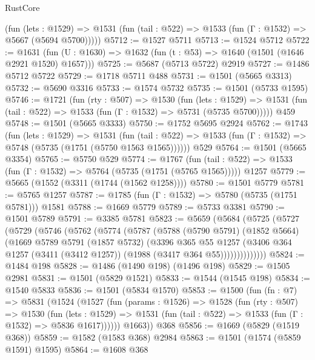 \begin{lexlean}{RustCore}
\begin{coremodule}
      (fun (lets : @1529) =>
      @1531 (fun (tail : @522) => @1533 (fun (Γ : @1532) => @5667 (@5694 @5700)))))
@5712 := @1527 @5711
@5713 := @1524 @5712
@5722 := @1631 (fun (U : @1630) => @1632 (fun (t : @53) => @1640 (@1501 (@1646 @2921 @1520) @1657)))
@5725 := @5687 (@5713 @5722) @2919
@5727 := @1486 @5712 @5722
@5729 := @1718 @5711 @488
@5731 := @1501 (@5665 @3313)
@5732 := @5690 @3316
@5733 := @1574 @5732
@5735 := @1501 (@5733 @1595)
@5746 := @1721
    (fun (rty : @507) =>
    @1530
      (fun (lets : @1529) =>
      @1531 (fun (tail : @522) => @1533 (fun (Γ : @1532) => @5731 (@5735 @5700)))))
    @459
@5748 := @1501 (@5665 @3333)
@5750 := @1752 @5695 @2924
@5762 := @1743
    (fun (lets : @1529) =>
    @1531
      (fun (tail : @522) => @1533 (fun (Γ : @1532) => @5748 (@5735 (@1751 (@5750 @1563 @1565))))))
    @529
@5764 := @1501 (@5665 @3354)
@5765 := @5750 @529
@5774 := @1767
    (fun (tail : @522) => @1533 (fun (Γ : @1532) => @5764 (@5735 (@1751 (@5765 @1565)))))
    @1257
@5779 := @5665 (@1552 (@3311 (@1744 (@1562 @1258))))
@5780 := @1501 @5779
@5781 := @5765 @1257
@5787 := @1785 (fun (Γ : @1532) => @5780 (@5735 (@1751 @5781))) @1581
@5788 := @1669 @5779
@5789 := @5733 @3381
@5790 := @1501 @5789
@5791 := @3385 @5781
@5823 := @5659
    (@5684
      (@5725
        (@5727
          (@5729
            (@5746
              (@5762
                (@5774
                  (@5787
                    (@5788
                      (@5790 @5791)
                      (@1852 @5664)
                      (@1669
                        @5789
                        @5791
                        (@1857 @5732)
                        (@3396
                          @365
                          @55
                          @1257
                          (@3406
                            @364
                            @1257
                            (@3411 (@3412 @1257))
                            (@1988 (@3417 @364 @55))))))))))))))
@5824 := @1484 @198
@5828 := @1486 (@1490 @198) (@1496 @198)
@5829 := @1505 @2981
@5831 := @1501 (@5829 @1521)
@5833 := @1544 (@1545 @198)
@5834 := @1540 @5833
@5836 := @1501 (@5834 @1570)
@5853 := @1500
    (fun (fn : @7) =>
    @5831
      (@1524
        (@1527
          (fun (params : @1526) =>
          @1528
            (fun (rty : @507) =>
            @1530
              (fun (lets : @1529) =>
              @1531 (fun (tail : @522) => @1533 (fun (Γ : @1532) => @5836 @1617))))))
        @1663))
    @368
@5856 := @1669 (@5829 (@1519 @368))
@5859 := @1582 (@1583 @368) @2984
@5863 := @1501 (@1574 (@5859 @1591) @1595)
@5864 := @1608 @368

\end{coremodule}
\end{lexlean}
